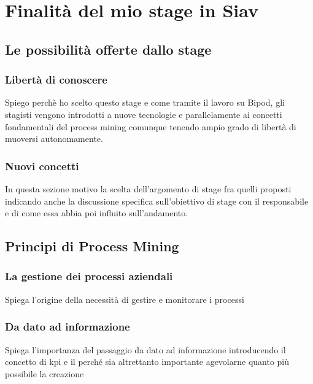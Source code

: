 
\chapter{Finalità del mio stage in Siav}
\label{cap:process-mining}
\section{Le possibilità offerte dallo stage}
\subsection{Libertà di conoscere}
Spiego perchè ho scelto questo stage e come tramite il lavoro su Bipod, gli stagisti vengono introdotti a nuove tecnologie e parallelamente ai concetti fondamentali del process mining comunque tenendo ampio grado di libertà di muoversi autonomamente.

\subsection{Nuovi concetti}
In questa sezione motivo la scelta dell'argomento di stage fra quelli proposti indicando anche la discussione specifica sull'obiettivo di stage con il responsabile e di come essa abbia poi influito sull'andamento.
\section{Principi di Process Mining}
\subsection{La gestione dei processi aziendali}
Spiega l'origine della necessità di gestire e monitorare i processi

\subsection{Da dato ad informazione}
Spiega l'importanza del passaggio da dato ad informazione introducendo il concetto di kpi e il perché sia altrettanto importante agevolarne quanto più possibile la creazione

